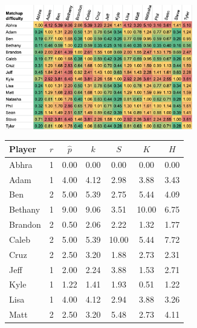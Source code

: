 \documentclass[letterpaper, 10 pt, conference]{ieeeconf}  %
\begin{document}
\begin{figure}[h!b]
        \begin{subfigure}[hb]{0.5\textwidth}
                \centering
                \includegraphics[width=0.9\textwidth]{fig/difficulty_4.png}
        \end{subfigure}
        \begin{subfigure}[hb]{0.4\textwidth}
                \footnotesize
                \centering
                \begin{tabular}{lccc|ccc}
                        \toprule
                        Player  & $r$   & $\hat{p}$ & $k$ & $S$ & $K$ & $H$ \\
                        \midrule
                        Abhra	& 1	& 0.00	& 0.00 & 0.00 & 0.00 & 0.00 \\
                        Adam	& 1	& 4.00	& 4.12 & 2.98 & 3.88 & 3.43 \\
                        Ben	& 2	& 5.00	& 5.39 & 2.75 & 5.44 & 4.09 \\
                        Bethany	& 1	& 9.00	& 9.06 & 3.51 & 10.00 & 6.75 \\
                        Brandon	& 2	& 0.50	& 2.06 & 2.22 & 1.32 & 1.77 \\
                        Caleb	& 2	& 5.00	& 5.39 & 10.00 & 5.44 & 7.72 \\
                        Cruz	& 2	& 2.50	& 3.20 & 1.88 & 2.73 & 2.31 \\
                        Jeff	& 1	& 2.00  & 2.24 & 3.88 & 1.53 & 2.71 \\
                        Kyle	& 1	& 1.22	& 1.41 & 1.93 & 0.51 & 1.22 \\
                        Lisa	& 1	& 4.00  & 4.12 & 2.94 & 3.88 & 3.26 \\
                        Matt	& 2	& 2.50  & 3.20 & 5.48 & 2.73 & 4.11 \\

\end{tabular}
\end{subfigure}
\end{figure}
\end{document}
